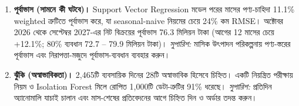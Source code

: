 \begin{enumerate}[leftmargin=*,itemsep=4pt]
\item \textbf{পূর্বাভাস (সামনে কী ঘটবে)।} Support Vector Regression মডেল পরের মাসের পণ্য-চাহিদা 11.1\% weighted ত্রুটিতে পূর্বাভাস করে, যা seasonal-naive নিয়মের চেয়ে 24\% কম RMSE। অক্টোবর 2026 থেকে সেপ্টেম্বর 2027-এর নিট বিক্রয়ের পূর্বাভাস 76.3 মিলিয়ন টাকা (আগের 12 মাসের চেয়ে +12.1\%; 80\% ব্যবধান 72.7 -- 79.9 মিলিয়ন টাকা)। \emph{সুপারিশ:} মাসিক উৎপাদন পরিকল্পনায় পণ্য-স্তরের পূর্বাভাস এবং নিরাপত্তা-মজুদে পূর্বাভাস-ব্যবধান ব্যবহার করুন।
\item \textbf{ঝুঁকি (অস্বাভাবিকতা)।} 2,465টি ব্যবসায়িক দিনের 28টি অস্বাভাবিক হিসেবে চিহ্নিত। একটি নিয়ন্ত্রিত পরীক্ষায় নিয়ম ও Isolation Forest মিলে রোপিত 1,000টি ডেটা-ত্রুটির 91\% ধরেছে। \emph{সুপারিশ:} প্রতিদিন অ্যানোমালি যাচাই চালান এবং মাস-শেষের প্রতিবেদনের আগে চিহ্নিত দিন ও অর্ডার তদন্ত করুন।
\end{enumerate}